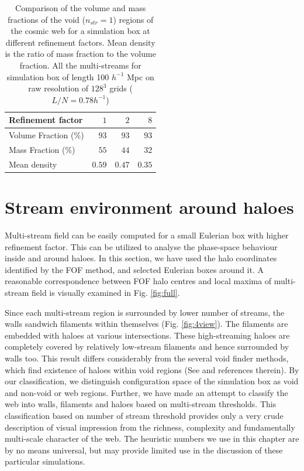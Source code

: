  \begin{table}
 \centering
  \caption{Comparison of the volume and mass fractions of the void ($n_{str} = 1$) regions of the cosmic web for a simulation box at different refinement factors. Mean density is the ratio of mass fraction to the volume fraction. All the multi-streams for simulation box of length 100 $h^{-1}$ Mpc on raw resolution of $128^{3}$ grids ($ L/N = 0.78 h^{-1}$) }
\begin{tabular}{|l|r|r|r|}
\hline
Refinement factor               & $1$ & $2$& $8$   \\ \hline
Volume Fraction (\%)                 & $93$   & $93$    & $93$       \\ \hline
Mass Fraction   (\%)               & $55$   & $44$   & $32$           \\ \hline
Mean density                    & $0.59$ & $0.47$    & $0.35$        \\ \hline
\end{tabular}

 \label{tab:Compare_ref}
\end{table}



\section{Stream environment around haloes}
\label{sec:local}

Multi-stream field can be easily computed for a small Eulerian box with higher refinement factor. This can be utilized to analyse the phase-space behaviour inside and around haloes. In this section, 
we have used the halo coordinates identified by the FOF method, and selected Eulerian boxes around it. A reasonable  correspondence between FOF halo centres and local maxima of multi-stream field is visually examined in Fig. \ref{fig:full}. 

Since each multi-stream region is surrounded by lower number of streams, the walls sandwich filaments within themselves (Fig. \ref{fig:4view}). The filaments are embedded with haloes at various intersections. These high-streaming haloes are completely covered by relatively low-stream filaments and hence surrounded by walls too. This result differs considerably from the several void finder methods, which find existence of haloes within  void regions (See \citealt{Colberg2008} and references therein). By our classification, we distinguish configuration space of the simulation box as void and non-void or web regions. Further, we have made an attempt to classify the web into walls, filaments and haloes based on multi-stream thresholds. This classification based on number of stream threshold provides only a very crude description of visual impression from the richness, complexity and fundamentally multi-scale character of the web. The heuristic numbers we use in this chapter are by no means universal, but may provide limited use in the discussion of these particular simulations.

